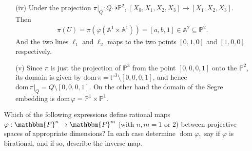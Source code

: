 \documentclass[12pt]{article}
\begin{document}
\begin{enumerate}
    \item[(iv)] Under the projection $\pi\vert_Q : Q \dashrightarrow \mathbb{P}^2$, $[X_0,X_1,X_2,X_3] \mapsto [X_1,X_2,X_3]$. Then
        \begin{align*}
            \pi(U) = \pi(\varphi(\mathbb{A}^1 \times \mathbb{A}^1)) = [a,b,1] \in \mathbb{A}^2 \subseteq \mathbb{P}^2.
        \end{align*}
        And the two lines $\ell_1$ and $\ell_2$ maps to the two points $[0,1,0]$ and $[1,0,0]$ respectively.

    \item[(v)] Since $\pi$ is just the projection of $\mathbb{P}^3$ from the point $[0,0,0,1]$ onto the $\mathbb{P}^2$, its domain is given by $\mathrm{dom}\, \pi = \mathbb{P}^3 \setminus [0,0,0,1]$, and hence $\mathrm{dom}\, \pi\vert_Q = Q \setminus [0,0,0,1]$. On the other hand the domain of the Segre embedding is $\mathrm{dom} \, \varphi = \mathbb{P}^1 \times \mathbb{P}^1$.
\end{enumerate}

\begin{prob}
    Which of the following expressions define rational maps \( \varphi: \mathbbm{P}^n \to \mathbbm{P}^m \) (with \( n,m = 1 \) or 2) between projective spaces of appropriate dimensions? In each case determine \( \operatorname{dom} \varphi, \) say if \( \varphi \) is birational, and if so, describe the inverse map.
\end{prob}
\end{document}
